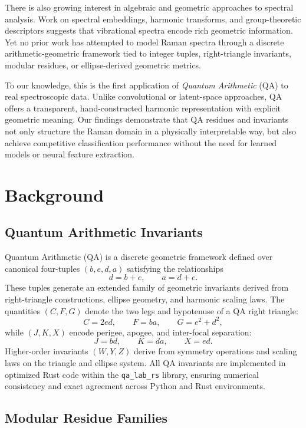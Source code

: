 \documentclass[12pt]{article}
\begin{document}
There is also growing interest in algebraic and geometric approaches to spectral analysis. Work on spectral
embeddings, harmonic transforms, and group-theoretic descriptors suggests that vibrational spectra encode
rich geometric information. Yet no prior work has attempted to model Raman spectra through a discrete
arithmetic-geometric framework tied to integer tuples, right-triangle invariants, modular residues, or
ellipse-derived geometric metrics.

To our knowledge, this is the first application of \emph{Quantum Arithmetic} (QA) to real spectroscopic
data. Unlike convolutional or latent-space approaches, QA offers a transparent, hand-constructed harmonic
representation with explicit geometric meaning. Our findings demonstrate that QA residues and invariants
not only structure the Raman domain in a physically interpretable way, but also achieve competitive
classification performance without the need for learned models or neural feature extraction.

\section{Background}
\label{sec:background}

\subsection{Quantum Arithmetic Invariants}

Quantum Arithmetic (QA) is a discrete geometric framework defined over canonical four-tuples
$(b,e,d,a)$ satisfying the relationships
\[
d = b + e, \qquad a = d + e.
\]
These tuples generate an extended family of geometric invariants derived from right-triangle
constructions, ellipse geometry, and harmonic scaling laws. The quantities $(C,F,G)$ denote the two legs
and hypotenuse of a QA right triangle:
\[
C = 2ed, \qquad F = ba, \qquad G = e^2 + d^2,
\]
while $(J,K,X)$ encode perigee, apogee, and inter-focal separation:
\[
J = bd, \qquad K = da, \qquad X = ed.
\]
Higher-order invariants $(W,Y,Z)$ derive from symmetry operations and scaling laws on the triangle and
ellipse system. All QA invariants are implemented in optimized Rust code within the \texttt{qa\_lab\_rs}
library, ensuring numerical consistency and exact agreement across Python and Rust environments.

\subsection{Modular Residue Families}
\end{document}
